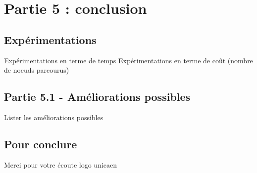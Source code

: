 \documentclass{beamer} %
\begin{document}
\section{Partie 5 : conclusion}
	\subsection{Expérimentations}
\begin{frame}[plain]
Expérimentations en terme de temps
Expérimentations en terme de coût (nombre de noeuds parcourus)
\end{frame}
	\subsection{Partie 5.1 - Améliorations possibles}
\begin{frame}[plain]
Lister les améliorations possibles
\end{frame}

	\subsection{Pour conclure}
Merci pour votre écoute
logo unicaen
\end{document}
